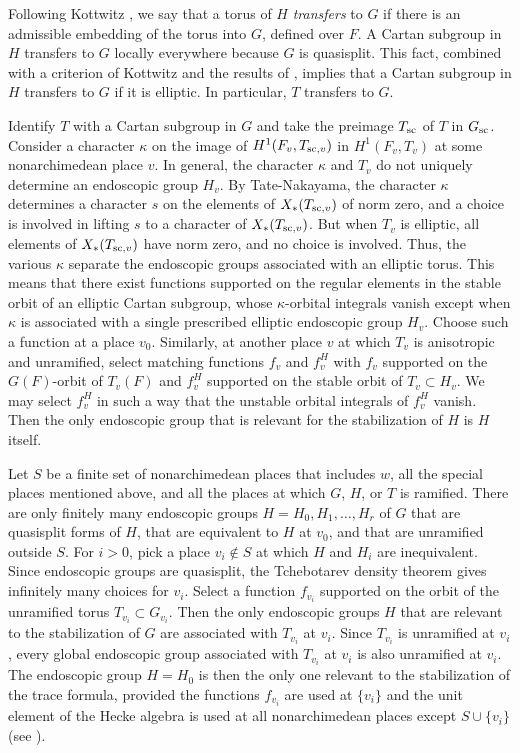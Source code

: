 Following Kottwitz \cite{Ko2}, we say that a torus 
of $H$ {\it transfers\/}
to $G$ if there is an admissible
embedding of the torus into $G$, defined over $F$.
A Cartan subgroup in $H$ transfers to $G$ locally everywhere because
$G$ is quasisplit. 
This fact, combined with a criterion of Kottwitz \cite{Ko2,9.5} and
the results of \cite{S,1.9}, implies that 
a Cartan subgroup in $H$ transfers to
$G$ if it is elliptic.  In particular, $T$ transfers to $G$.

Identify $T$ with a Cartan subgroup in $G$ and take the
preimage $T_{\text{sc}}$ of $T$ in $G_{\text{sc}}$.
Consider a character $\kappa$ on the image of $H^1(F_v,T_{{\text{sc}},v})$ in
$H^1(F_v,T_v)$ at some nonarchimedean place $v$.  In general, the
character $\kappa$ and $T_v$ do not uniquely determine an
endoscopic group $H_v$.  
By Tate-Nakayama, the character $\kappa$
determines a character $s$ on the elements of
$X_*(T_{{\text{sc}},v})$ of norm zero,  and a choice
is involved in lifting $s$ to a character of $X_*(T_{{\text{sc}},v})$.  But
when $T_v$ is elliptic, all elements of $X_*(T_{{\text{sc}},v})$
have norm zero,
and no choice is involved.  Thus, the various $\kappa$
separate the endoscopic groups associated with an elliptic torus.  This
means that there exist functions supported on the regular
elements in the stable orbit of an elliptic Cartan subgroup,
whose $\kappa$-orbital integrals vanish except when $\kappa$
is associated with a single prescribed elliptic endoscopic
group $H_v$.  Choose such a function at a place $v_0$.
Similarly, at another place $v$ at which $T_v$ is
anisotropic and unramified, select matching functions $f_v$ and $f_v^H$
with $f_v$ supported on the $G(F)$-orbit of $T_v(F)$ and $f_v^H$
supported on the stable orbit of $T_v\subset H_v$.  We may select $f_v^H$
in such a way that
the unstable orbital integrals of $f_v^H$ vanish.  Then the only
endoscopic group that is relevant for the stabilization of $H$
is $H$ itself.

Let $S$ be a finite set of nonarchimedean places that includes $w$,
all the special places mentioned above,  and
all the places at which $G$, $H$, or $T$ is ramified.  There
are only finitely many endoscopic groups $H=H_0,H_1,\ldots,H_r$
of $G$ that are
quasisplit forms of $H$, that are equivalent to $H$ at $v_0$,
 and that are unramified outside $S$.
For $i>0$, pick a place
$v_i\not\in S$ at which $H$ and $H_i$ are inequivalent.  Since
endoscopic groups are 
quasisplit, the Tchebotarev density theorem gives
infinitely many choices for $v_i$.  Select a function $f_{v_i}$
supported on the orbit of the unramified torus $T_{v_i}\subset G_{v_i}$.
Then the only endoscopic groups $H$ that are relevant to the 
stabilization of $G$ are associated with $T_{v_i}$ at $v_i$.  Since
$T_{v_i}$ is unramified at $v_i$, every global endoscopic group
associated with $T_{v_i}$ at $v_i$ is also unramified at $v_i$.
The endoscopic group $H=H_0$
is then the only one relevant to the stabilization
of the trace formula, provided the functions
$f_{v_i}$ are used at $\{v_i\}$ and the unit element of the
Hecke algebra is used at all nonarchimedean places except $S\cup \{v_i\}$
(see \cite{Ko3,7.5}).  
\bigskip

